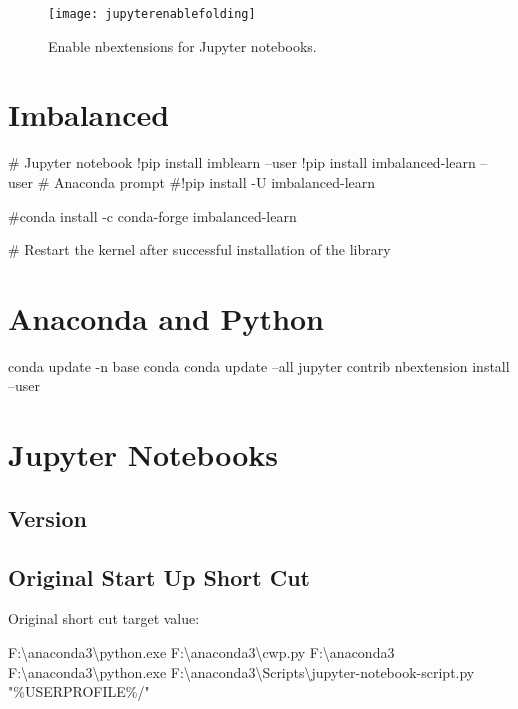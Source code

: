 	\begin{figure}[tbp]
		\centering
		\texttt{[image: jupyterenablefolding]}
		\caption[Enable nbextensions for Jupyter notebooks]{Enable nbextensions for Jupyter notebooks.}
		\label{fig:jupyterenablefolding}
	\end{figure}


	\section{Imbalanced}
	\begin{code}[\codenumbering]{}
		\codeitemnonumber \# Jupyter notebook
		\codeitemnonumber !pip install imblearn --user
		\codeitemnonumber !pip install imbalanced-learn --user
		\codeitemnonumber
		\codeitemnonumber \# Anaconda prompt
		\codeitemnonumber \#!pip install -U imbalanced-learn

		\codeitemnonumber \#conda install -c conda-forge imbalanced-learn

		\codeitemnonumber \# Restart the kernel after successful installation of the library
	\end{code}

	\section{Anaconda and Python}
	\begin{code}[\codenumbering]{}
		\codeitemnonumber conda update -n base conda
		\codeitemnonumber conda update --all
		\codeitemnonumber jupyter contrib nbextension install --user
	\end{code}


	\section{Jupyter Notebooks}
	\subsection{Version}

	\subsection{Original Start Up Short Cut}
Original short cut target value:
	\begin{code}[\codenumbering]{}
		\codeitemnonumber F:\textbackslash{}anaconda3\textbackslash{}python.exe F:\textbackslash{}anaconda3\textbackslash{}cwp.py F:\textbackslash{}anaconda3 F:\textbackslash{}anaconda3\textbackslash{}python.exe F:\textbackslash{}anaconda3\textbackslash{}Scripts\textbackslash{}jupyter-notebook-script.py "\%USERPROFILE\%/"
	\end{code}

